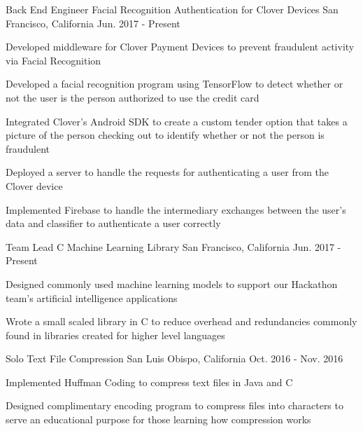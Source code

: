 \begin{cventries}


\cventry
{Back End Engineer} %
{Facial Recognition Authentication for Clover Devices} %
{San Francisco, California} %
{Jun. 2017 - Present} %
{ %
\begin{cvitems}
\item {Developed middleware for Clover Payment Devices to prevent fraudulent activity via Facial Recognition}
\item {Developed a facial recognition program using TensorFlow to detect whether or not the user is the person authorized to use the credit card}
\item {Integrated Clover's Android SDK to create a custom tender option that takes a picture of the person checking out to identify whether or not the person is fraudulent}
\item {Deployed a server to handle the requests for authenticating a user from the Clover device}
\item {Implemented Firebase to handle the intermediary exchanges between the user's data and classifier to authenticate a user correctly}
\end{cvitems}
}

\cventry
{Team Lead} %
{C Machine Learning Library} %
{San Francisco, California} %
{Jun. 2017 - Present} %
{ %
\begin{cvitems}
\item {Designed commonly used machine learning models to support our Hackathon team's artificial intelligence applications}
\item {Wrote a small scaled library in C to reduce overhead and redundancies commonly found in libraries created for higher level languages}
\end{cvitems}
}

\cventry
{Solo} %
{Text File Compression} %
{San Luis Obispo, California} %
{Oct. 2016 - Nov. 2016} %
{ %
\begin{cvitems}
\item {Implemented Huffman Coding to compress text files in Java and C}
\item {Designed complimentary encoding program to compress files into characters to serve an educational purpose for those learning how compression works}
\end{cvitems}
}


\end{cventries}
